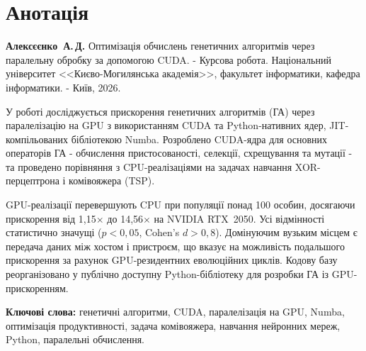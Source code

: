 \documentclass[14pt,a4paper]{extarticle}
\begin{document}
\section*{Анотація}

\textbf{Алексєєнко~А.\,Д.} Оптимізація обчислень генетичних алгоритмів через паралельну обробку за допомогою CUDA. - Курсова робота. Національний університет <<Києво-Могилянська академія>>, факультет інформатики, кафедра інформатики. - Київ, 2026.

\bigskip
У роботі досліджується прискорення генетичних алгоритмів (ГА) через паралелізацію на GPU з використанням CUDA та Python-нативних ядер, JIT-компільованих бібліотекою Numba. Розроблено CUDA-ядра для основних операторів ГА - обчислення пристосованості, селекції, схрещування та мутації - та проведено порівняння з CPU-реалізаціями на задачах навчання XOR-перцептрона і комівояжера (TSP).

GPU-реалізації перевершують CPU при популяції понад 100 особин, досягаючи прискорення від 1,15$\times$ до 14,56$\times$ на NVIDIA RTX~2050. Усі відмінності статистично значущі ($p < 0{,}05$, Cohen's $d > 0{,}8$). Домінуючим вузьким місцем є передача даних між хостом і пристроєм, що вказує на можливість подальшого прискорення за рахунок GPU-резидентних еволюційних циклів. Кодову базу реорганізовано у публічно доступну Python-бібліотеку для розробки ГА із GPU-прискоренням.

\bigskip
\textbf{Ключові слова:} генетичні алгоритми, CUDA, паралелізація на GPU, Numba, оптимізація продуктивності, задача комівояжера, навчання нейронних мереж, Python, паралельні обчислення.
\end{document}
